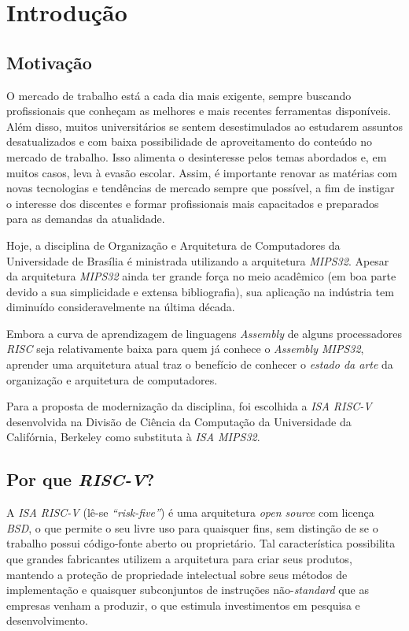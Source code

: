 \chapter{Introdução}\label{CapIntro}


\section{Motivação}
{
    O mercado de trabalho está a cada dia mais exigente, sempre buscando
    profissionais que conheçam as melhores e mais recentes ferramentas
    disponíveis. Além disso, muitos universitários se sentem desestimulados
    ao estudarem assuntos desatualizados e com baixa possibilidade de
    aproveitamento do conteúdo no mercado de trabalho. Isso alimenta o
    desinteresse pelos temas abordados e, em muitos casos, leva à evasão
    escolar. Assim, é importante renovar as matérias com novas tecnologias
    e tendências de mercado sempre que possível, a fim de instigar o
    interesse dos discentes e formar profissionais mais capacitados e
    preparados para as demandas da atualidade.
}

{
    Hoje, a disciplina de Organização e Arquitetura de Computadores da
    Universidade de Brasília é ministrada utilizando a arquitetura
    \textit{MIPS32}. Apesar da arquitetura \textit{MIPS32} ainda ter
    grande força no meio acadêmico (em boa parte devido a sua simplicidade
    e extensa bibliografia), sua aplicação na indústria tem diminuído
    consideravelmente na última década.
}

{
    Embora a curva de aprendizagem de linguagens \textit{Assembly} de
    alguns processadores \textit{RISC} seja relativamente baixa para quem
    já  conhece o \textit{Assembly MIPS32}, aprender uma arquitetura atual
    traz o benefício de conhecer o \textit{estado da arte} da organização e
    arquitetura de computadores.
}

{
    Para a proposta de modernização da disciplina, foi escolhida a 
    \textit{ISA RISC-V} desenvolvida na Divisão de Ciência da Computação da
    Universidade da Califórnia, Berkeley como substituta à
    \textit{ISA MIPS32}.
}


\section{Por que \textit{RISC-V}?}
{
    A \textit{ISA RISC-V} (lê-se \textit{``risk-five''}) é uma arquitetura
    \textit{open source} com licença \textit{BSD}, o que permite o seu
    livre uso para quaisquer fins, sem distinção de se o trabalho possui
    código-fonte aberto ou proprietário. Tal característica possibilita que
    grandes fabricantes utilizem a arquitetura para criar seus produtos,
    mantendo a proteção de propriedade intelectual sobre seus métodos de
    implementação e quaisquer subconjuntos de instruções
    não-\textit{standard} que as empresas venham a produzir, o que
    estimula investimentos em pesquisa e desenvolvimento.
}

